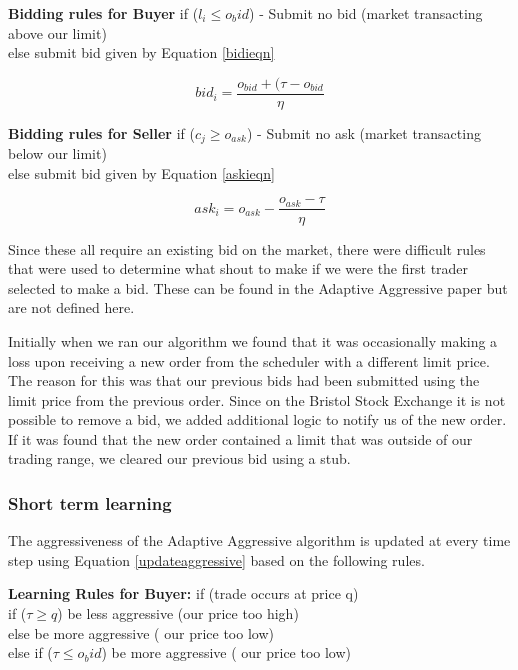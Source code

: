 \documentclass{acm_proc_article-sp}
\begin{document}
\textbf{Bidding rules for Buyer}
if ($l_i \leq o_bid$) - Submit no bid (market transacting above our limit)\\
else submit bid given by Equation \ref{bidieqn}

\begin{equation}
bid_i = \frac{o_{bid} + (\tau - o_{bid}}{\eta}
\label{bidieqn}
\end{equation}

\textbf{Bidding rules for Seller}
if ($c_j \geq o_{ask}$) - Submit no ask (market transacting below our limit)\\
else submit bid given by Equation \ref{askieqn}

\begin{equation}
ask_i = o_{ask} - \frac{o_{ask}-\tau}{\eta}
\label{askieqn}
\end{equation}

Since these all require an existing bid on the market, there were difficult
rules that were used to determine what shout to make if we were the first
trader selected to make a bid. These can be found in the Adaptive Aggressive
paper \cite[p.~32]{AA_paper} but are not defined here.

Initially when we ran our algorithm we found that it was occasionally making a
loss upon receiving a new order from the scheduler with a different limit
price. The reason for this was that our previous bids had been submitted using
the limit price from the previous order. Since on the Bristol Stock Exchange it
is not possible to remove a bid, we added additional logic to notify us of the
new order. If it was found that the new order contained a limit that was
outside of our trading range, we cleared our previous bid using a stub.\\


\subsubsection{Short term learning} \label{sec:AA_short_term_learning}
The aggressiveness of the Adaptive Aggressive algorithm is updated at every
time step using Equation \ref{updateaggressive} based on the following rules.

\textbf{Learning Rules for Buyer:}
if (trade occurs at price q)\\
    \indent if ($\tau \geq q$) be less aggressive (our price too high)\\
    \indent else be more aggressive ( our price too low)\\
else if ($\tau \leq o_bid$) be more aggressive ( our price too low)
\end{document}
